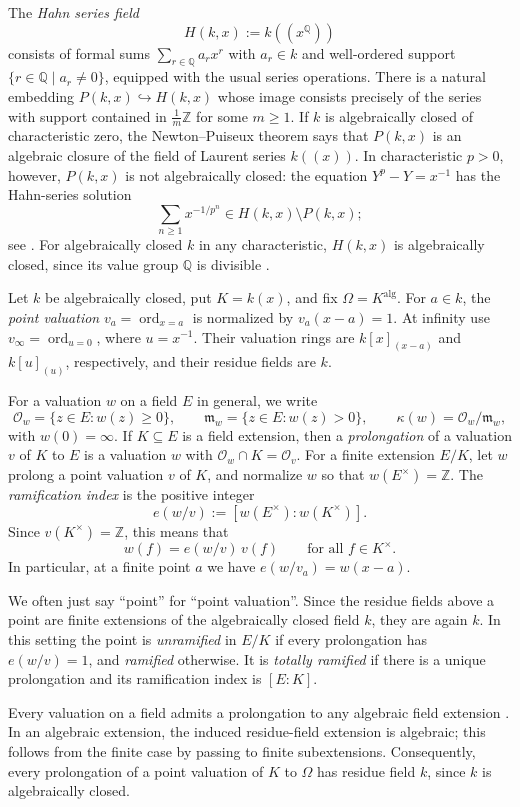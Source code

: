 \documentclass[10pt,a4paper]{amsart}
\renewcommand{\ge}{\geqslant}
\theoremstyle{definition}
\newcommand{\Q}{\mathbb Q}
\newcommand{\Z}{\mathbb Z}
\newcommand{\alg}{\mathrm{alg}}
\begin{document}
The \emph{Hahn series field}
\[
H(k,x):=k((x^{\Q}))
\]
consists of formal sums $\sum_{r\in\Q}a_rx^r$ with
$a_r\in k$ and well-ordered support
$\{r\in\Q\mid a_r\ne0\}$, equipped with the usual series
operations. There is a natural embedding
$P(k,x)\hookrightarrow H(k,x)$ whose image consists
precisely of the series with support contained in
$\frac1m\Z$ for some $m\ge1$.
If $k$ is algebraically closed of characteristic zero,
the Newton--Puiseux theorem says that $P(k,x)$ is an
algebraic closure of the field of Laurent series $k((x))$.
In characteristic $p>0$, however, $P(k,x)$ is not
algebraically closed: the equation $Y^p-Y=x^{-1}$
has the Hahn-series solution
\[
\sum_{n\ge1}x^{-1/p^n}\in H(k,x)\setminus P(k,x);
\]
see \cite[Section~1]{Poonen}. For algebraically closed $k$ in any characteristic,
$H(k,x)$ is algebraically closed, since its value group
$\Q$ is divisible \cite[Corollary~4]{Poonen}.

Let $k$ be algebraically closed, put $K=k(x)$, and fix
$\Omega=K^{\alg}$. For $a\in k$, the \emph{point valuation}
$v_a=\operatorname{ord}_{x=a}$ is normalized by $v_a(x-a)=1$.
At infinity use $v_\infty=\operatorname{ord}_{u=0}$, where $u=x^{-1}$.
Their valuation rings are $k[x]_{(x-a)}$ and $k[u]_{(u)}$,
respectively, and their residue fields are $k$.

For a valuation $w$ on a field $E$ in general, we write
\[
\mathcal O_w=\{z\in E:w(z)\ge0\},\qquad
\mathfrak m_w=\{z\in E:w(z)>0\},\qquad
\kappa(w)=\mathcal O_w/\mathfrak m_w,
\]
with $w(0)=\infty$. If $K\subseteq E$ is a field extension, then a \emph{prolongation} of a valuation $v$ of
$K$ to $E$ is a valuation $w$ with
$\mathcal O_w\cap K=\mathcal O_v$. For a finite extension $E/K$, let $w$ prolong a point
valuation $v$ of $K$, and normalize $w$ so that
$w(E^\times)=\Z$.
The \emph{ramification index} is the positive integer
\[
e(w/v):=[w(E^\times):w(K^\times)].
\]
Since $v(K^\times)=\Z$, this means that
\[
w(f)=e(w/v)\,v(f)\qquad\text{for all $f\in K^\times$}.
\]
In particular, at a finite point $a$ we have
$e(w/v_a)=w(x-a)$.

We often just say ``point'' for ``point valuation''. Since the residue fields above a point are finite extensions of the
algebraically closed field $k$, they are again $k$. In this setting
the point is \emph{unramified} in $E/K$ if every prolongation has
$e(w/v)=1$, and \emph{ramified} otherwise. It is \emph{totally
ramified} if there is a unique prolongation and its ramification
index is $[E:K]$.

Every valuation on a field admits a prolongation to any
algebraic field extension \cite[Tag~00IA]{Stacks}.
In an algebraic extension, the induced residue-field extension
is algebraic; this follows from the finite case by passing
to finite subextensions.
Consequently, every prolongation of a point valuation of $K$
to $\Omega$ has residue field $k$, since $k$ is algebraically
closed. 
\end{document}
